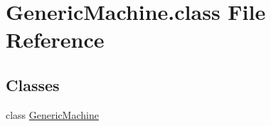 \hypertarget{GenericMachine_8class}{\section{Generic\-Machine.\-class File Reference}
\label{GenericMachine_8class}
}
\subsection*{Classes}
\begin{DoxyCompactItemize}
\item 
class \hyperlink{classGenericMachine}{Generic\-Machine}
\end{DoxyCompactItemize}
